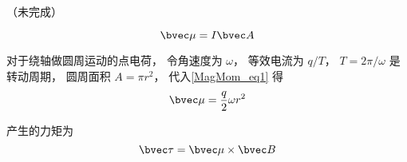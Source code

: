 
（未完成）

\begin{equation}\label{MagMom_eq1}
\bvec \mu = I \bvec A
\end{equation}

对于绕轴做圆周运动的点电荷， 令角速度为 $\omega$， 等效电流为 $q/T$， $T = 2\pi/\omega$ 是转动周期， 圆周面积 $A = \pi r^2$， 代入\autoref{MagMom_eq1} 得
\begin{equation}
\bvec \mu = \frac{q}{2} \omega r^2
\end{equation}

产生的力矩为
\begin{equation}
\bvec \tau = \bvec \mu \times \bvec B
\end{equation}
